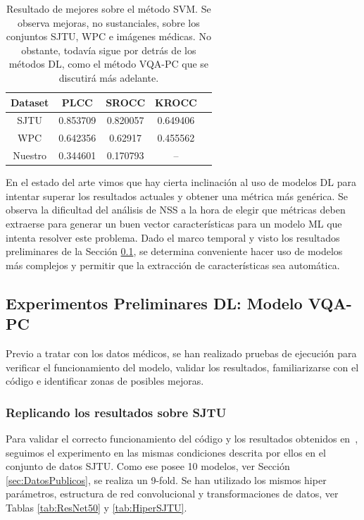 \begin{table}[htp]
  \scriptsize
  \begin{center}
    \begin{tabular}[c]{|c|c|c|c|c|}
      \hline
      \rowcolor[HTML]{FFC702}
      \textbf{Dataset} & \textbf{PLCC} & \textbf{SROCC} & \textbf{KROCC} \\ 
      \hline
      SJTU & 0.853709 & 0.820057 & 0.649406 \\ 
      \hline 
      WPC & 0.642356 & 0.62917 & 0.455562 \\
      \hline 
      Nuestro & 0.344601 &  0.170793 & -- \\
      \hline
    \end{tabular}
  \end{center}
  \caption[Resultado de mejores sobre el método SVM]{Resultado de mejores sobre el método SVM.
   Se observa mejoras, no sustanciales, sobre los conjuntos SJTU, WPC e imágenes médicas.
   No obstante, todavía sigue por detrás de los métodos DL, como el método VQA-PC 
   que se discutirá más adelante.
  }
  \label{tab:ImprovNR3DQA}
\end{table}

En el estado del arte vimos que hay cierta inclinación al uso de modelos 
DL para intentar superar los resultados actuales y obtener una métrica más 
genérica. Se observa la dificultad del análisis de NSS a la hora de elegir que métricas 
deben extraerse para generar un buen vector características para un modelo ML 
que intenta resolver este problema. Dado el marco temporal y visto los 
resultados preliminares de la Sección \ref{sec:PreResults}, se determina 
conveniente hacer uso de modelos más complejos y permitir que la extracción 
de características sea automática. 

\subsection{Experimentos Preliminares DL: Modelo VQA-PC}
\label{sec:PreResults}
Previo a tratar con los datos médicos, se han realizado pruebas de ejecución 
para verificar el funcionamiento del modelo, validar los resultados, familiarizarse 
con el código e identificar zonas de posibles mejoras.

\subsubsection{Replicando los resultados sobre SJTU}
Para validar el correcto funcionamiento del código y los resultados obtenidos 
en~\cite{VQA-PC}, seguimos el experimento en las mismas condiciones descrita 
por ellos en el conjunto de datos SJTU. Como ese posee 10 modelos, 
ver Sección \ref{sec:DatosPublicos}, se realiza un 9-fold. Se han utilizado 
los mismos hiper parámetros, estructura de red convolucional y transformaciones 
de datos, ver Tablas 
\ref{tab:ResNet50} y \ref{tab:HiperSJTU}. 

